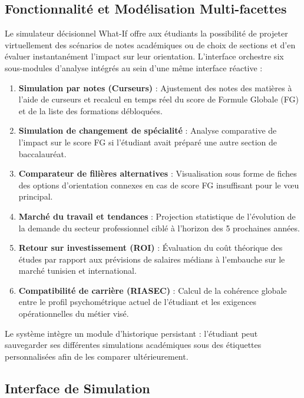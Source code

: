 \subsection{Fonctionnalité et Modélisation Multi-facettes}

Le simulateur décisionnel What-If offre aux étudiants la possibilité de projeter virtuellement des scénarios de notes académiques ou de choix de sections et d'en évaluer instantanément l'impact sur leur orientation. L'interface orchestre six sous-modules d'analyse intégrés au sein d'une même interface réactive :

\begin{enumerate}
    \item \textbf{Simulation par notes (Curseurs)} : Ajustement des notes des matières à l'aide de curseurs et recalcul en temps réel du score de Formule Globale (FG) et de la liste des formations débloquées.
    \item \textbf{Simulation de changement de spécialité} : Analyse comparative de l'impact sur le score FG si l'étudiant avait préparé une autre section de baccalauréat.
    \item \textbf{Comparateur de filières alternatives} : Visualisation sous forme de fiches des options d'orientation connexes en cas de score FG insuffisant pour le vœu principal.
    \item \textbf{Marché du travail et tendances} : Projection statistique de l'évolution de la demande du secteur professionnel ciblé à l'horizon des 5 prochaines années.
    \item \textbf{Retour sur investissement (ROI)} : Évaluation du coût théorique des études par rapport aux prévisions de salaires médians à l'embauche sur le marché tunisien et international.
    \item \textbf{Compatibilité de carrière (RIASEC)} : Calcul de la cohérence globale entre le profil psychométrique actuel de l'étudiant et les exigences opérationnelles du métier visé.
\end{enumerate}

Le système intègre un module d'historique persistant : l'étudiant peut sauvegarder ses différentes simulations académiques sous des étiquettes personnalisées afin de les comparer ultérieurement.

\subsection{Interface de Simulation}

